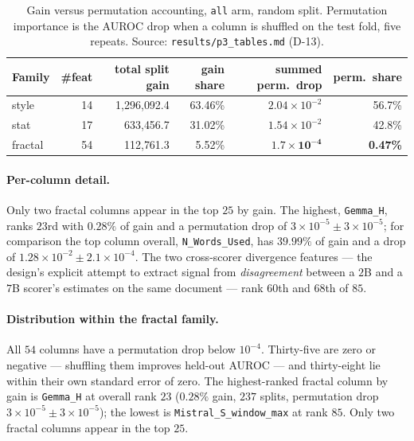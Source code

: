 \documentclass{article}
\newcommand{\arm}[1]{\texttt{#1}}
\begin{document}
\begin{table}[h]
\centering
\footnotesize
\caption{Gain versus permutation accounting, \arm{all} arm, random split.
Permutation importance is the AUROC drop when a column is shuffled on the test
fold, five repeats. Source: \texttt{results/p3\_tables.md} (D-13).}
\label{tab:gain}
\begin{tabular}{lrrrrr}
\toprule
Family & \#feat & total split gain & gain share & summed perm.\ drop & perm.\ share \\
\midrule
style    & 14 & 1{,}296{,}092.4 & 63.46\% & $2.04\times10^{-2}$ & 56.7\% \\
stat     & 17 &    633{,}456.7  & 31.02\% & $1.54\times10^{-2}$ & 42.8\% \\
fractal  & 54 &    112{,}761.3  &  5.52\% & $\mathbf{1.7\times10^{-4}}$ & \textbf{0.47\%} \\
\bottomrule
\end{tabular}
\end{table}

\paragraph{Per-column detail.} Only two fractal columns appear in the top $25$ by
gain. The highest, \texttt{Gemma\_H}, ranks $23$rd with $0.28\%$ of gain and a
permutation drop of $3\!\times\!10^{-5}\pm3\!\times\!10^{-5}$; for comparison the
top column overall, \texttt{N\_Words\_Used}, has $39.99\%$ of gain and a drop of
$1.28\!\times\!10^{-2}\pm2.1\!\times\!10^{-4}$. The two cross-scorer divergence
features --- the design's explicit attempt to extract signal from
\emph{disagreement} between a $2$B and a $7$B scorer's estimates on the same
document --- rank $60$th and $68$th of $85$.

\paragraph{Distribution within the fractal family.} All $54$ columns have a
permutation drop below $10^{-4}$. Thirty-five are zero or negative --- shuffling
them improves held-out AUROC --- and thirty-eight lie within their own standard
error of zero. The highest-ranked fractal column by gain is \texttt{Gemma\_H} at
overall rank $23$ ($0.28\%$ gain, $237$ splits, permutation drop
$3\times10^{-5}\pm3\times10^{-5}$); the lowest is
\texttt{Mistral\_S\_window\_max} at rank $85$. Only two fractal columns appear
in the top $25$.
\end{document}
